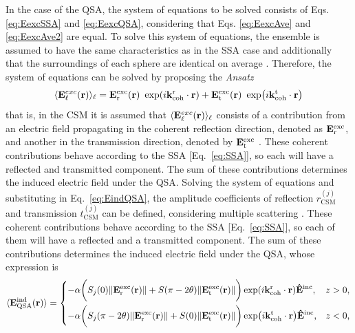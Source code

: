 In the case of the QSA, the system of equations to be solved consists of Eqs. \eqref{eq:EexcSSA} and \eqref{eq:EexcQSA}, considering that Eqs. \eqref{eq:EexcAve} and \eqref{eq:EexcAve2} are equal. To solve this system of equations, the ensemble is assumed to have the same characteristics as in the SSA case and additionally that the surroundings of each sphere are identical on average \cite{garcia2012multiple}. Therefore, the system of equations can be solved by proposing the \textit{Ansatz}
%
\begin{align}
	\langle\vb{E}^{exc}_\ell(\vb{r}) \rangle_\ell =
	\vb{E}^\text{exc}_\text{r}(\vb{r})\ \exp(i\vb{k}^\text{r}_\text{coh}\cdot\vb{r}) +
	\vb{E}^\text{exc}_\text{t}(\vb{r})\ \exp(i\vb{k}^\text{t}_\text{coh}\cdot\vb{r})
\end{align}
%
that is, in the CSM it is assumed that $\langle\vb{E}^{exc}_\ell (\vb{r})\rangle_\ell$ consists of a contribution from an electric field propagating in the coherent reflection direction, denoted as $\vb{E}^\text{exc}_\text{r}$, and another in the transmission direction, denoted by $\vb{E}^\text{exc}_\text{t}$ \cite{garcia2012multiple}. These coherent contributions behave according to the SSA [Eq.~\eqref{eq:SSA}], so each will have a reflected and transmitted component. The sum of these contributions determines the induced electric field under the QSA. Solving the system of equations and substituting in Eq.~\eqref{eq:EindQSA}, the amplitude coefficients of reflection $r^{(j)}_\text{CSM}$ and transmission $t^{(j)}_\text{CSM}$ can be defined, considering multiple scattering \cite{garcia2012multiple,barrera_coherent_2003}. These coherent contributions behave according to the SSA [Eq.~\eqref{eq:SSA}], so each of them will have a reflected and a transmitted component. The sum of these contributions determines the induced electric field under the QSA, whose expression is
%
\begin{align}
	\langle \vb{E}_\text{QSA}^\text{ind}(\vb{r})\rangle =
	\begin{dcases}
		-\alpha \bigg( S_j(0) \norm{\vb{E}^\text{exc}_\text{r}(\vb{r})} +  S(\pi-2\theta)\norm{\vb{E}^\text{exc}_\text{t}(\vb{r})}\bigg)
		\exp(i\vb{k}^\text{r}_\text{coh}\cdot\vb{r}) \vu{E}^\text{inc}, & z > 0, \\
		-\alpha \bigg( S_j(\pi-2\theta) \norm{\vb{E}^\text{exc}_\text{r}(\vb{r})} + S(0)\norm{\vb{E}^\text{exc}_\text{t}(\vb{r})}\bigg)
		\exp(i\vb{k}^\text{t}_\text{coh}\cdot\vb{r}) \vu{E}^\text{inc},  & z < 0, \\
	\end{dcases}
	\label{eq:EindQSA}
\end{align}
